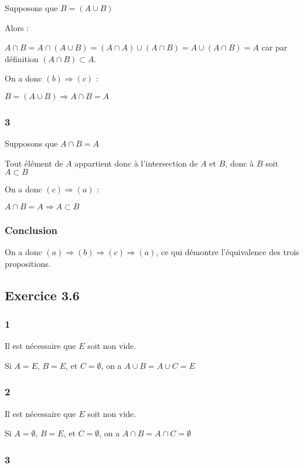 \documentclass[a4paper,10pt]{report}
\begin{document}
Supposons que $B = (A \cup B)$

Alors :

$A \cap B = A \cap (A \cup B) = (A \cap A) \cup (A \cap B) = A \cup (A \cap B) = A$ car par définition $(A \cap B) \subset A$.

On a donc $(b) \Longrightarrow (c)$ :

$B = (A \cup B) \Longrightarrow A \cap B = A$

\subsubsection*{3}

Supposons que $A \cap B = A$

Tout élément de $A$ appartient donc à l'intersection de $A$ et $B$, donc à $B$ soit $A \subset B$

On a donc $(c) \Longrightarrow (a)$ :

$A \cap B = A \Longrightarrow A \subset B$

\subsubsection*{Conclusion}

On a donc $(a) \Longrightarrow (b) \Longrightarrow (c) \Longrightarrow (a)$, ce qui démontre l'équivalence
des trois propositions.


\subsection*{Exercice 3.6}
\subsubsection*{1}
Il est nécessaire que $E$ soit non vide.

Si $A=E$, $B=E$, et $C=\emptyset$, on a $A \cup B = A \cup C = E$ 

\subsubsection*{2}
Il est nécessaire que $E$ soit non vide.

Si $A=\emptyset$, $B=E$, et $C=\emptyset$, on a $A \cap B = A \cap C = \emptyset$ 

\subsubsection*{3}
\end{document}
